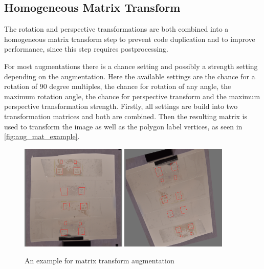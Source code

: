 \documentclass[10pt]{book}
\begin{document}
\subsection{Homogeneous Matrix Transform}

The rotation and perspective transformations are both combined into a homogeneous matrix transform step to prevent code duplication and to improve performance, since this step requires postprocessing.

For most augmentations there is a chance setting and possibly a strength setting depending on the augmentation. Here the available settings are the chance for a rotation of 90 degree multiples, the chance for rotation of any angle, the maximum rotation angle, the chance for perspective transform and the maximum perspective transformation strength. Firstly, all settings are build into two transformation matrices and both are combined. Then the resulting matrix is used to transform the image as well as the polygon label vertices, as seen in \autoref{fig:aug_mat_example}.

\begin{figure}
  \centering
     {\includegraphics[width=0.45\textwidth]{image/aug_mat_before}}
     {\includegraphics[width=0.45\textwidth]{image/aug_mat_after}}
  \caption{An example for matrix transform augmentation}
  \label{fig:aug_mat_example}
\end{figure}
\end{document}
